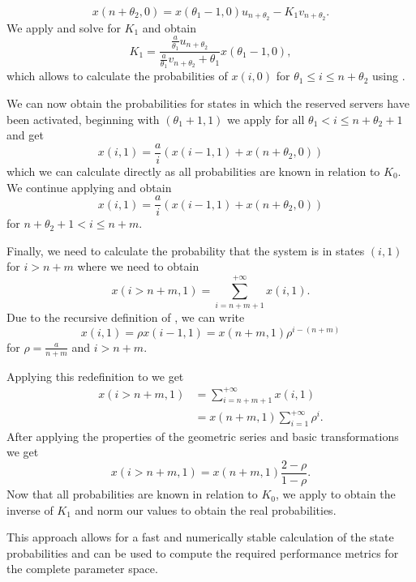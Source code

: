 \begin{equation*}
x(n+\theta_2,0) = x(\theta_1 -1,0) u_{n+\theta_2} - K_1 v_{n+\theta_2}.
\end{equation*}
We apply  and solve for \(K_1\) and obtain
\begin{equation*}
K_1 =  \frac{\frac{a}{\theta_1} u_{n+\theta_2}}{\frac{a}{\theta_1} v_{n + \theta_2} + \theta_1} x(\theta_1 - 1, 0),
\end{equation*}
which allows to calculate the probabilities of \(x(i,0)\) for \(\theta_1 \leq i \leq n + \theta_2\) using .

We can now obtain the probabilities for states in which the reserved servers have been activated, beginning with \((\theta_1 + 1,1)\) we apply  for all \(\theta_1 < i \leq n + \theta_2 + 1\) and get
\begin{equation*}
x(i,1) = \frac{a}{i}(x(i-1,1)+ x(n+\theta_2,0))
\end{equation*}
which we can calculate directly as all probabilities are known in relation to \(K_0\).
We continue applying  and obtain
\begin{equation}
x(i,1) = \frac{a}{i}(x(i-1,1) + x(n+\theta_2,0))\label{eq:cloud:data_centers:modeling:energy_efficient:probability_greater_nm}
\end{equation}
for \(n + \theta_2 + 1 < i \leq n + m\).

Finally, we need to calculate the probability that the system is in states \((i,1)\) for \(i > n + m\) where we need to obtain
\begin{equation*}
x(i>n+m,1) = \sum_{i = n + m + 1}^{+ \infty} x(i,1).
\end{equation*}
Due to the recursive definition of , we can write
\begin{equation*}
x(i,1) = \rho x(i-1,1) = x(n + m,1)\rho^{i-(n+m)}
\end{equation*}
for \(\rho = \frac{a}{n + m}\) and \(i > n + m\).

Applying this redefinition to  we get
\begin{align*}
x(i>n+m,1) &= \sum_{i = n + m + 1}^{+ \infty} x(i, 1)\\
&= x(n+m,1)\sum_{i=1}^{+\infty} \rho^i.\nonumber
\end{align*}
After applying the properties of the geometric series and basic transformations we get
\begin{equation*}
x(i>n+m,1) =x(n + m,1) \frac{2-\rho}{1-\rho}.
\end{equation*}
Now that all probabilities are known in relation to \(K_0\), we apply  to obtain the inverse of \(K_1\) and norm our values to obtain the real probabilities.

This approach allows for a fast and numerically stable calculation of the state probabilities and can be used to compute the required performance metrics for the complete parameter space.
